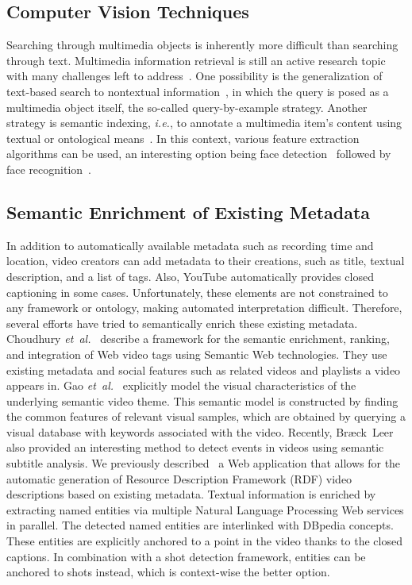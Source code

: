 \documentclass[runningheads,a4paper]{llncs}
\begin{document}
\subsection{Computer Vision Techniques}
Searching through multimedia objects is inherently more difficult than searching through text.
Multimedia information retrieval is still an active research topic with many challenges left to address~\cite{Hanjalic:2008}.
One possibility is the generalization of text-based search to nontextual information~\cite{Sivic:2008}, in which the query is posed as a multimedia object itself, the so-called query-by-example strategy.
Another strategy is semantic indexing, \emph{i.e.}, to annotate a multimedia item's content using textual or ontological means~\cite{Hauptmann:2008}.
In this context, various feature extraction algorithms can be used, an interesting option being face detection~\cite{ViolaJones} followed by face recognition~\cite{Verstockt:2009}.

\subsection{Semantic Enrichment of Existing Metadata}
In addition to automatically available metadata such as recording time and location, video creators can add metadata to their creations, such as title, textual description, and a list of tags. Also, YouTube automatically provides closed captioning in some cases. Unfortunately, these elements are not constrained to any framework or ontology, making automated interpretation difficult. Therefore, several efforts have tried to semantically enrich these existing metadata. Choudhury \emph{et~al.}~\cite{Choudhury:YouTube} describe a framework for the semantic enrichment, ranking, and integration of Web video tags using Semantic Web technologies. They use existing metadata and social features such as related videos and playlists a video appears in. Gao \emph{et~al.}~\cite{Gao:2009} explicitly model the visual characteristics of the underlying semantic video theme. This semantic model is constructed by finding the common features of relevant visual samples, which are obtained by querying a visual database with keywords associated with the video. Recently, Br{\ae}ck~Leer~\cite{BraeckLeer:2011} also provided an interesting method to detect events in videos using semantic subtitle analysis. We previously described~\cite{semwebvid} a Web application that allows for the automatic generation of Resource Description Framework (RDF) video descriptions based on existing metadata. Textual information is enriched by extracting named entities via multiple Natural Language Processing Web services in parallel. The detected named entities are interlinked with DBpedia concepts. These entities are explicitly anchored to a point in the video thanks to the closed captions. In combination with a shot detection framework, entities can be anchored to shots instead, which is context-wise the better option.
\end{document}
